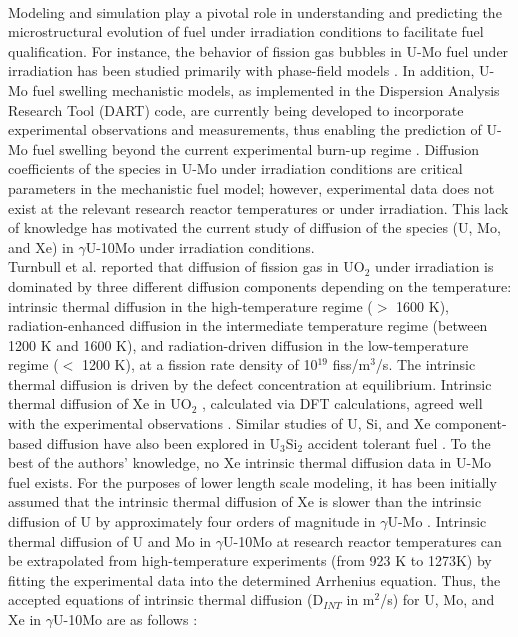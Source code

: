 \documentclass[preprint,12pt]{elsarticle}
\begin{document}
\\
\indent Modeling and simulation play a pivotal role in understanding and predicting the microstructural evolution of fuel under irradiation conditions to facilitate fuel qualification. For instance, the behavior of fission gas bubbles in U-Mo fuel under irradiation has been studied primarily with phase-field models \cite{hu2009phase, hu2016formation, liang2018three, liang2018fission}. In addition, U-Mo fuel swelling mechanistic models, as implemented in the Dispersion Analysis Research Tool (DART) code, are currently being developed to incorporate experimental observations and measurements, thus enabling the prediction of U-Mo fuel swelling beyond the current experimental burn-up regime \cite{ye2015dart, ye2018modelling}. Diffusion coefficients of the species in U-Mo under irradiation conditions are critical parameters in the mechanistic fuel model; however, experimental data does not exist at the relevant research reactor temperatures or under irradiation. This lack of knowledge has motivated the current study of diffusion of the species (U, Mo, and Xe) in $\gamma$U-10Mo under irradiation conditions.\\ 
\indent Turnbull et al. \cite{turnbull1982diffusion} reported that diffusion of fission gas in UO$_{2}$ under irradiation is dominated by three different diffusion components depending on the temperature: intrinsic thermal diffusion in the high-temperature regime ($>$ 1600 K), radiation-enhanced diffusion in the intermediate temperature regime (between 1200 K and 1600 K), and radiation-driven diffusion in the low-temperature regime ($<$ 1200 K), at a fission rate density of 10$^{19}$ fiss/m$^{3}$/s. The intrinsic thermal diffusion is driven by the defect concentration at equilibrium. Intrinsic thermal diffusion of Xe in UO$_{2}$ \cite{perriot2019atomistic}, calculated via DFT calculations, agreed well with the experimental observations \cite{turnbull1982diffusion}. Similar studies of U, Si, and Xe component-based diffusion have also been explored in U$_3$Si$_2$ accident tolerant fuel \cite{cooper2021irradiation, beeler2021radiation}. 
To the best of the authors' knowledge, no Xe intrinsic thermal diffusion data in U-Mo fuel exists. For the purposes of lower length scale modeling, it has been initially assumed that the intrinsic thermal diffusion of Xe is slower than the intrinsic diffusion of U by approximately four orders of magnitude in $\gamma$U-Mo \cite{hu2016formation, hu2016microstructural, Beeler2018microstructural}. Intrinsic thermal diffusion of U and Mo in $\gamma$U-10Mo at research reactor temperatures can be extrapolated from high-temperature experiments (from 923 K to 1273K) by fitting the experimental data \cite{huang2013} into the determined Arrhenius equation. Thus, the accepted equations of intrinsic thermal diffusion (D$_{INT}$ in m$^{2}$/s) for U, Mo, and Xe in $\gamma$U-10Mo are as follows \cite{hu2016formation, hu2016microstructural, Beeler2018microstructural, huang2013}:
\end{document}
